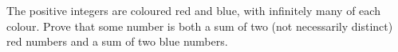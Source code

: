 The positive integers are coloured red and blue, with infinitely many of each colour. Prove that some number is both a sum of two (not necessarily distinct) red numbers and a sum of two blue numbers.

